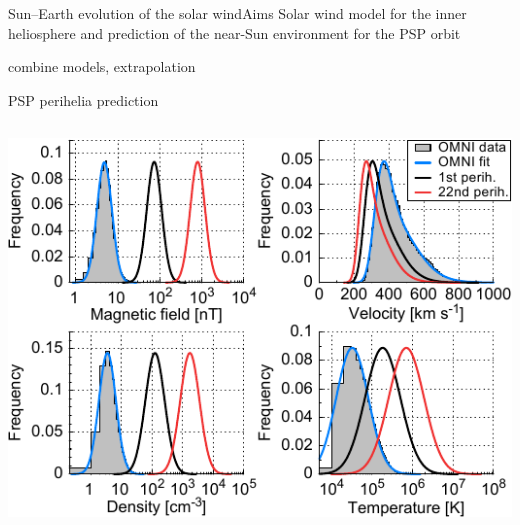 \begin{frame}[plain,c]{Sun--Earth evolution of the solar wind}{Aims}
	Solar wind model for the inner heliosphere and prediction of the near-Sun environment for the PSP orbit
\end{frame}

\begin{frame}[plain,c]{}{}
	combine models, extrapolation
\end{frame}
\begin{frame}[plain,c]{PSP perihelia prediction}{}
	\begin{columns}[c]
		
		\includegraphics[width=\textwidth]{../figures_paper/SPP_sw_distributions_b.pdf}


	\end{columns}
\end{frame}



% 






